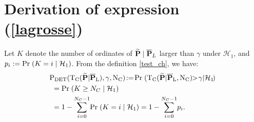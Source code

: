 \documentclass[journal]{IEEEtran}
\begin{document}
 \section{Derivation of expression  (\ref{lagrosse}) }
   \label{app6} 
   Let $K$ denote the number of  ordinates of  ${\bf \widetilde{\bf P}}\;|\;\overline{\bf P}_L$  larger than $\gamma$  under $\mathcal{H}_1$,
 and $p_i := \textrm{Pr}\; ( K=i\;|\;{\cal{H}}_1)$.  From the definition \eqref{test_ch}, we have:
  \begin{equation}  
\begin{aligned} 
	&\!\!\rm{P_{DET}}({T}_{C}( {\bf \widetilde{\bf P}}|\overline{\bf P}_L),\gamma,N_C) \!:=\! \textrm{Pr}\; ( {T_C  ({\bf \widetilde{\bf P}}|\overline{\bf P}_L,N_C)}\!\! > \!\gamma | {\cal{H}}_1\!)\! \\
	&=  \textrm{Pr}\; ( K\geq N_C\;|\;{\cal{H}}_1) \\
	&= 1- { \sum_{i=0}^{N_C-1} } \textrm{Pr}\; ( K=i\;|\;{\cal{H}}_1) =  1- \displaystyle{ \sum_{i = 0}^{N_C-1}} p_i.
\end{aligned}
\label{pfab}
 \end{equation}
 
\end{document}
